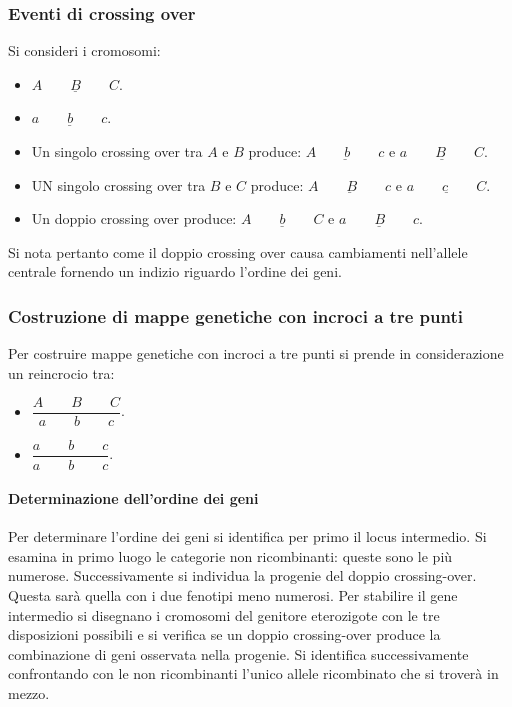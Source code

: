 		\subsubsection{Eventi di crossing over}
		Si consideri i cromosomi:
		\begin{multicols}{2}
			\begin{itemize}
				\item $\underline{A\qquad B\qquad C}$.
				\item $\underline{a\qquad b\qquad c}$.
			\end{itemize}
		\end{multicols}
		\begin{multicols}{2}
			\begin{itemize}
				\item Un singolo crossing over tra $A$ e $B$ produce: $\underline{A\qquad b\qquad c}$ e $\underline{a\qquad B\qquad C}$.
				\item UN singolo crossing over tra $B$ e $C$ produce: $\underline{A\qquad B\qquad c}$ e $\underline{a\qquad c\qquad C}$.
				\item Un doppio crossing over produce: $\underline{A\qquad b\qquad C}$ e $\underline{a\qquad B\qquad c}$.
			\end{itemize}
		\end{multicols}
		Si nota pertanto come il doppio crossing over causa cambiamenti nell'allele centrale fornendo un indizio riguardo l'ordine dei geni.

		\subsubsection{Costruzione di mappe genetiche con incroci a tre punti}
		Per costruire mappe genetiche con incroci a tre punti si prende in considerazione un reincrocio tra:
		\begin{multicols}{2}
			\begin{itemize}
				\item $\dfrac{A\qquad B\qquad C}{a\qquad b\qquad c}$.
				\item $\dfrac{a\qquad b\qquad c}{a\qquad b\qquad c}$.
			\end{itemize}
		\end{multicols}

			\paragraph{Determinazione dell'ordine dei geni}
			Per determinare l'ordine dei geni si identifica per primo il locus intermedio.
			Si esamina in primo luogo le categorie non ricombinanti: queste sono le pi\`u numerose.
			Successivamente si individua la progenie del doppio crossing-over.
			Questa sar\`a quella con i due fenotipi meno numerosi.
			Per stabilire il gene intermedio si disegnano i cromosomi del genitore eterozigote con le tre disposizioni possibili e si verifica se un doppio crossing-over produce la combinazione di geni osservata nella progenie.
			Si identifica successivamente confrontando con le non ricombinanti l'unico allele ricombinato che si trover\`a in mezzo.


